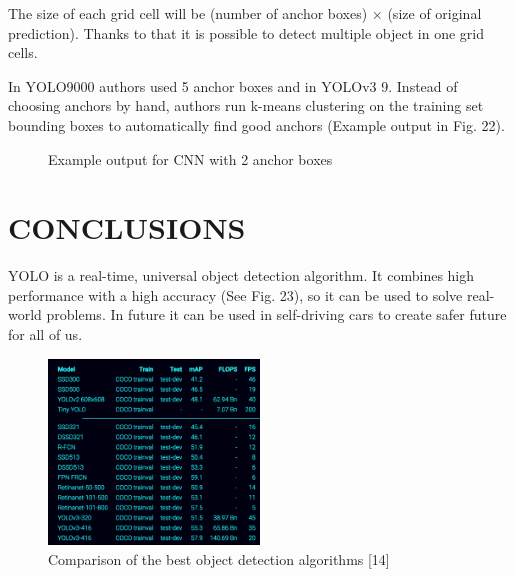 \documentclass[letterpaper, 10 pt, conference]{ieeeconf}  %
\begin{document}
The size of each grid cell will be (number of anchor boxes) $\times$ (size of original prediction). Thanks to that it is possible to detect multiple object in one grid cells.

In YOLO9000 authors used 5 anchor boxes and in YOLOv3 9. Instead of choosing anchors by hand, authors run k-means clustering on the training set bounding boxes to automatically find good anchors (Example output in Fig. 22). 


\begin{figure}[!ht]
	\centering

	\caption{Example output for CNN with 2 anchor boxes}
\end{figure}


\section{CONCLUSIONS}
YOLO is a real-time, universal object detection algorithm. It combines high performance with a  high accuracy (See Fig. 23), so it can be used to solve real-world problems. In future it can be used in self-driving cars to create safer future for all of us.

\begin{figure}[!ht]
	\centering
    \includegraphics[width=0.5\textwidth]{Pictures/yolo_stats.png}
	\caption{Comparison of the best object detection algorithms [14]}
\end{figure}
\end{document}
